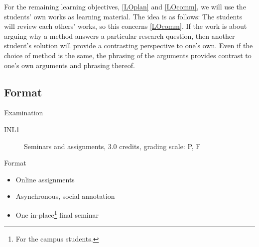 For the remaining learning objectives, \ref{LOplan} and \ref{LOcomm}, we will 
use the students' own works as learning material.
The idea is as follows:
The students will review each others' works, so this concerns \ref{LOcomm}.
If the work is about arguing why a method answers a particular research 
question, then another student's solution will provide a contrasting 
perspective to one's own.
Even if the choice of method is the same, the phrasing of the arguments 
provides contrast to one's own arguments and phrasing thereof.


\subsection{Format}

\begin{frame}[fragile]
  \begin{block}{Examination}
    \begin{description}
      \item[INL1] Seminars and assignments, 3.0 credits, grading scale: P, F
    \end{description}
  \end{block}

  \pause

  \begin{block}{Format}
    \begin{itemize}
      \item Online assignments
      \item Asynchronous, social annotation
      \item One in-place\footnote{%
          For the campus students.
        } final seminar
    \end{itemize}
  \end{block}
\end{frame}

